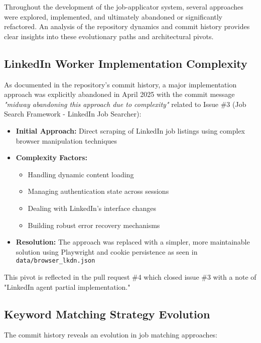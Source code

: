 \documentclass[a4paper,12pt]{article}
\begin{document}
Throughout the development of the job-applicator system, several approaches were explored, implemented, and ultimately abandoned or significantly refactored. An analysis of the repository dynamics and commit history provides clear insights into these evolutionary paths and architectural pivots.

\subsection{LinkedIn Worker Implementation Complexity}
\label{subsec:linkedin-worker-complexity}

As documented in the repository's commit history, a major implementation approach was explicitly abandoned in April 2025 with the commit message \textit{"midway abandoning this approach due to complexity"} related to Issue \#3 (Job Search Framework - LinkedIn Job Searcher):

\begin{itemize}
    \item \textbf{Initial Approach:} Direct scraping of LinkedIn job listings using complex browser manipulation techniques
    \item \textbf{Complexity Factors:} 
    \begin{itemize}
        \item Handling dynamic content loading
        \item Managing authentication state across sessions
        \item Dealing with LinkedIn's interface changes
        \item Building robust error recovery mechanisms
    \end{itemize}
    \item \textbf{Resolution:} The approach was replaced with a simpler, more maintainable solution using Playwright and cookie persistence as seen in \texttt{data/browser\_lkdn.json}
\end{itemize}

This pivot is reflected in the pull request \#4 which closed issue \#3 with a note of "LinkedIn agent partial implementation."

\subsection{Keyword Matching Strategy Evolution}

The commit history reveals an evolution in job matching approaches:
\end{document}
